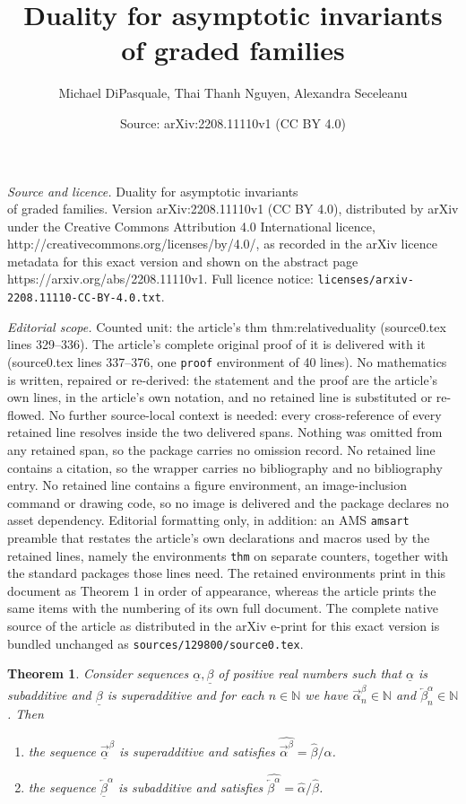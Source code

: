 \documentclass[10pt,a4paper]{amsart}
\title{Duality for asymptotic invariants \\of graded families}
\author{Michael DiPasquale, Thai Thanh Nguyen, Alexandra Seceleanu}
\date{Source: arXiv:2208.11110v1 (CC BY 4.0)}
\newtheorem{thm}{Theorem}
\newcommand{\N}{{\mathbb N}}
\def\a{\ensuremath{\alpha}}
\newcommand{\au}{\overrightarrow{\alpha}}
\def\b{\ensuremath{\beta}}
\newcommand{\bo}{\overleftarrow{\beta}}
\def\ua{\ensuremath{\underline{\alpha}}}
\newcommand{\uau}{\overrightarrow{\ua}}
\def\ub{\ensuremath{\underline{\beta}}}
\newcommand{\ubo}{\overleftarrow{\ub}}
\begin{document}
\maketitle

\noindent\emph{Source and licence.} Duality for asymptotic invariants \\of graded families. Version arXiv:2208.11110v1 (CC BY 4.0), distributed by arXiv under the Creative Commons Attribution 4.0 International licence, http://creativecommons.org/licenses/by/4.0/, as recorded in the arXiv licence metadata for this exact version and shown on the abstract page https://arxiv.org/abs/2208.11110v1. Full licence notice: \texttt{licenses/arxiv-2208.11110-CC-BY-4.0.txt}.\par\smallskip

\noindent\textit{Editorial scope.} Counted unit: the article's thm thm:relativeduality (source0.tex lines 329--336). The article's complete original proof of it is delivered with it (source0.tex lines 337--376, one \texttt{proof} environment of 40 lines). No mathematics is written, repaired or re-derived: the statement and the proof are the article's own lines, in the article's own notation, and no retained line is substituted or re-flowed.  No further source-local context is needed: every cross-reference of every retained line resolves inside the two delivered spans.  Nothing was omitted from any retained span, so the package carries no omission record.  No retained line contains a citation, so the wrapper carries no bibliography and no bibliography entry.  No retained line contains a figure environment, an image-inclusion command or drawing code, so no image is delivered and the package declares no asset dependency.  Editorial formatting only, in addition: an AMS \texttt{amsart} preamble that restates the article's own declarations and macros used by the retained lines, namely the environments \texttt{thm} on separate counters, together with the standard packages those lines need.  The retained environments print in this document as Theorem 1 in order of appearance, whereas the article prints the same items with the numbering of its own full document.  The complete native source of the article as distributed in the arXiv e-print for this exact version is bundled unchanged as \texttt{sources/129800/source0.tex}.
 \begin{thm}
\label{thm:relativeduality}
Consider sequences $\ua, \ub$ of positive real numbers such that $\ua$ is subadditive  and $\ub$ is superadditive and for each $n\in\N$ we have $\au^\b_n\in\N$ and $\bo^\a_n\in\N$. Then
\begin{enumerate}
\item  the sequence $\uau^\b$ is superadditive and satisfies $\widehat{\au^\b}=\widehat{\b}/\widehat{\a}$.
\item the sequence $\ubo^\a$ is subadditive and satisfies $\widehat{\bo^\a}=\widehat{\a}/\widehat{\b}$.
\end{enumerate}
\end{thm}
\end{document}
